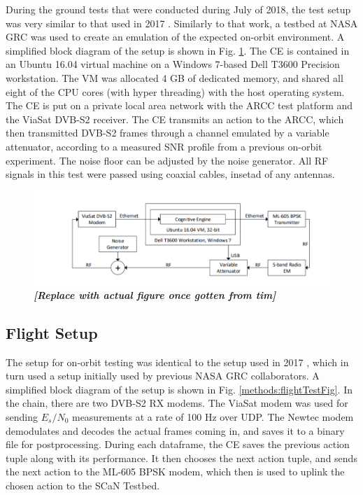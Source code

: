 \par During the ground tests that were conducted during July of 2018, the test setup was very similar to that used in 2017 \cite{tim_implementation}.  Similarly to that work, a testbed at NASA GRC was used to create an emulation of the expected on-orbit environment. A simplified block diagram of the setup is shown in Fig. \ref{methods:groundTestFig}. The CE is contained in an Ubuntu 16.04 virtual machine on a Windows 7-based Dell T3600 Precision workstation. The VM was allocated 4 GB of dedicated memory, and shared all eight of the CPU cores (with hyper threading) with the host operating system. The CE is put on a private local area network with the ARCC test platform and the ViaSat DVB-S2 receiver. The CE transmits an action to the ARCC, which then transmitted DVB-S2 frames through a channel emulated by a variable attenuator, according to a measured SNR profile from a previous on-orbit experiment. The noise floor can be adjusted by the noise generator. All RF signals in this test were passed using coaxial cables, insetad of any antennas.
\begin{figure}[ht]
\includegraphics[width=\textwidth]{figures/groundHW_tmp.png}
\caption{\textbf{\textit{[Replace with actual figure once gotten from tim]}}}\label{methods:groundTestFig}
\end{figure} 

\subsection{Flight Setup}
\par The setup for on-orbit testing was identical to the setup used in 2017 \cite{tim_implementation}, which in turn used a setup initially used by previous NASA GRC collaborators. A simplified block diagram of the setup is shown in Fig. \ref{methods:flightTestFig}. In the chain, there are two DVB-S2 RX modems. The ViaSat modem was used for sending $E_s/N_0$ measurements at a rate of 100 Hz over UDP. The Newtec modem demodulates and decodes the actual frames coming in, and saves it to a binary file for postprocessing. During each dataframe, the CE saves the previous action tuple along with its performance. It then chooses the next action tuple, and sends the next action to the ML-605 BPSK modem, which then is used to uplink the chosen action to the SCaN Testbed.

